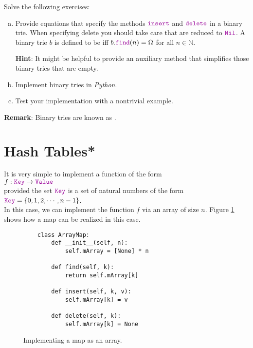 Solve the following exercises:
\begin{enumerate}[(a)]
\item Provide equations that specify the methods $\mytt{insert}$ and $\mytt{delete}$ in a binary trie.
      When specifying delete you should take care that  are reduced to
      $\mytt{Nil}$.  A binary trie $b$ is defined to be  iff $b.\mytt{find}(n) = \Omega$ for all $n \in \mathbb{N}$.

      \textbf{Hint}:  It might be helpful to provide an auxiliary method that simplifies those binary tries
      that are empty. 
\item Implement binary tries in \textsl{Python}.
\item Test your implementation with a nontrivial example.
\end{enumerate}
\textbf{Remark}: Binary tries are known as .  \eox

\section{Hash Tables*}
It is very simple to implement a function of the form \\[0.2cm]
\hspace*{1.3cm} $f: \mytt{Key} \rightarrow \mytt{Value}$ \\[0.2cm]
provided the set $\mytt{Key}$ is a set of natural numbers of the form  \\[0.2cm]
\hspace*{1.3cm} $\mytt{Key} = \{ 0, 1, 2, \cdots, n-1 \}$. \\[0.2cm]
In this case, we can implement the function $f$ via an array of size $n$.
Figure \ref{fig:map-array.ipython} shows how a map can be realized in this case.

\begin{figure}[!ht]
\centering
\begin{verbatim}
    class ArrayMap:
        def __init__(self, n):
            self.mArray = [None] * n
            
        def find(self, k):
            return self.mArray[k]
        
        def insert(self, k, v):
            self.mArray[k] = v
    
        def delete(self, k):
            self.mArray[k] = None
\end{verbatim}
\vspace*{-0.3cm}
\caption{Implementing a map as an array.}
\label{fig:map-array.ipython}
\end{figure}

